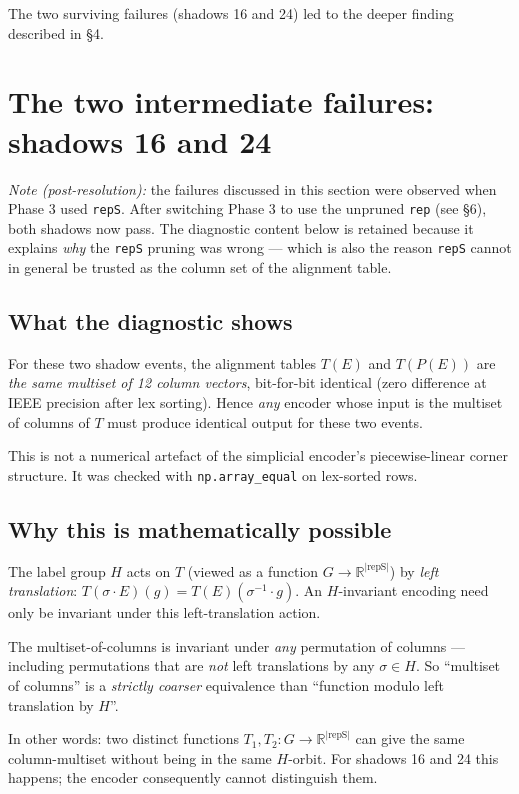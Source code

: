 \documentclass[a4paper,11pt]{article}
\begin{document}
The two surviving failures (shadows 16 and 24) led to the deeper
finding described in \S4.

\section{The two intermediate failures: shadows 16 and 24}

\emph{Note (post-resolution):} the failures discussed in this section
were observed when Phase 3 used \texttt{repS}.  After switching Phase 3
to use the unpruned \texttt{rep} (see \S6), both shadows now pass.
The diagnostic content below is retained because it explains
\emph{why} the \texttt{repS} pruning was wrong --- which is also the
reason \texttt{repS} cannot in general be trusted as the column set of
the alignment table.


\subsection{What the diagnostic shows}
For these two shadow events, the alignment tables $T(E)$ and
$T(P(E))$ are \emph{the same multiset of 12 column vectors},
bit-for-bit identical (zero difference at IEEE precision after lex
sorting).  Hence \emph{any} encoder whose input is the multiset of
columns of $T$ must produce identical output for these two events.

This is not a numerical artefact of the simplicial encoder's
piecewise-linear corner structure.  It was checked with
\texttt{np.array\_equal} on lex-sorted rows.

\subsection{Why this is mathematically possible}
The label group $H$ acts on $T$ (viewed as a function
$G \to \mathbb{R}^{|\text{repS}|}$) by \emph{left translation}:
$T(\sigma \cdot E)(g) = T(E)(\sigma^{-1} \cdot g)$.  An $H$-invariant
encoding need only be invariant under this left-translation action.

The multiset-of-columns is invariant under \emph{any} permutation of
columns --- including permutations that are \emph{not} left
translations by any $\sigma \in H$.  So
``multiset of columns'' is a \emph{strictly coarser} equivalence than
``function modulo left translation by $H$''.

In other words: two distinct functions $T_1, T_2 : G \to
\mathbb{R}^{|\text{repS}|}$ can give the same column-multiset without
being in the same $H$-orbit.  For shadows 16 and 24 this happens; the
encoder consequently cannot distinguish them.
\end{document}
